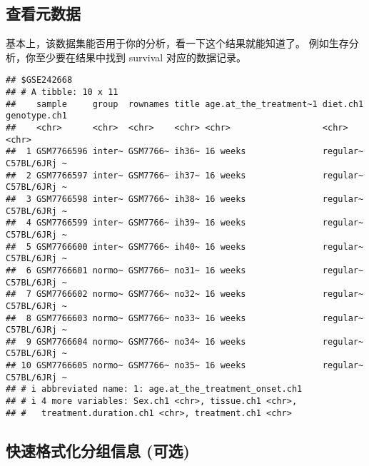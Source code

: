\documentclass[
]{article}
\newenvironment{Shaded}{\begin{snugshade}}{\end{snugshade}}
\newcommand{\DataTypeTok}[1]{\textcolor[rgb]{0.13,0.29,0.53}{#1}}
\newcommand{\DecValTok}[1]{\textcolor[rgb]{0.00,0.00,0.81}{#1}}
\newcommand{\KeywordTok}[1]{\textcolor[rgb]{0.13,0.29,0.53}{\textbf{#1}}}
\newcommand{\NormalTok}[1]{#1}
\newcommand{\OperatorTok}[1]{\textcolor[rgb]{0.81,0.36,0.00}{\textbf{#1}}}
\begin{document}
\hypertarget{ux67e5ux770bux5143ux6570ux636e}{%
\subsection{查看元数据}\label{ux67e5ux770bux5143ux6570ux636e}}

基本上，该数据集能否用于你的分析，看一下这个结果就能知道了。
例如生存分析，你至少要在结果中找到 survival 对应的数据记录。

\begin{Shaded}
\end{Shaded}

\begin{verbatim}
## $GSE242668
## # A tibble: 10 x 11
##    sample     group  rownames title age.at_the_treatment~1 diet.ch1 genotype.ch1
##    <chr>      <chr>  <chr>    <chr> <chr>                  <chr>    <chr>       
##  1 GSM7766596 inter~ GSM7766~ ih36~ 16 weeks               regular~ C57BL/6JRj ~
##  2 GSM7766597 inter~ GSM7766~ ih37~ 16 weeks               regular~ C57BL/6JRj ~
##  3 GSM7766598 inter~ GSM7766~ ih38~ 16 weeks               regular~ C57BL/6JRj ~
##  4 GSM7766599 inter~ GSM7766~ ih39~ 16 weeks               regular~ C57BL/6JRj ~
##  5 GSM7766600 inter~ GSM7766~ ih40~ 16 weeks               regular~ C57BL/6JRj ~
##  6 GSM7766601 normo~ GSM7766~ no31~ 16 weeks               regular~ C57BL/6JRj ~
##  7 GSM7766602 normo~ GSM7766~ no32~ 16 weeks               regular~ C57BL/6JRj ~
##  8 GSM7766603 normo~ GSM7766~ no33~ 16 weeks               regular~ C57BL/6JRj ~
##  9 GSM7766604 normo~ GSM7766~ no34~ 16 weeks               regular~ C57BL/6JRj ~
## 10 GSM7766605 normo~ GSM7766~ no35~ 16 weeks               regular~ C57BL/6JRj ~
## # i abbreviated name: 1: age.at_the_treatment_onset.ch1
## # i 4 more variables: Sex.ch1 <chr>, tissue.ch1 <chr>,
## #   treatment.duration.ch1 <chr>, treatment.ch1 <chr>
\end{verbatim}

\hypertarget{ux5febux901fux683cux5f0fux5316ux5206ux7ec4ux4fe1ux606f-ux53efux9009}{%
\subsection{快速格式化分组信息 (可选)}\label{ux5febux901fux683cux5f0fux5316ux5206ux7ec4ux4fe1ux606f-ux53efux9009}}
\end{document}
